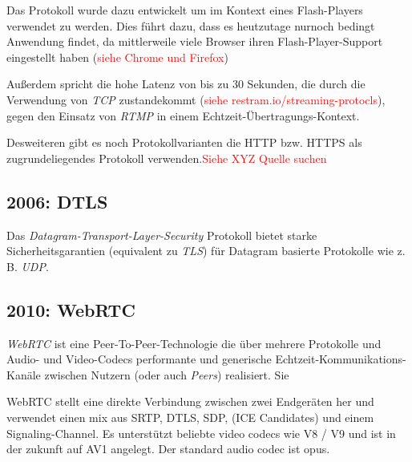 \documentclass{article}
\begin{document}
\begin{onecolumn}
Das Protokoll wurde dazu entwickelt um im Kontext eines Flash-Players verwendet
zu werden. Dies führt dazu, dass es heutzutage nurnoch bedingt Anwendung
findet, da mittlerweile viele Browser ihren Flash-Player-Support eingestellt
haben (\textcolor{red}{siehe Chrome und Firefox}) %

Außerdem spricht die hohe Latenz von bis zu 30 Sekunden, die durch die
Verwendung von \textit{TCP} zustandekommt (\textcolor{red}{siehe
restram.io/streaming-protocls}), gegen den Einsatz von \textit{RTMP} in einem
Echtzeit-Übertragungs-Kontext.

Desweiteren gibt es noch Protokollvarianten die HTTP bzw. HTTPS als zugrundeliegendes
Protokoll verwenden.\textcolor{red}{Siehe XYZ Quelle suchen}

\subsection{2006: DTLS}

Das \textit{Datagram-Transport-Layer-Security} Protokoll bietet starke
Sicherheitsgarantien (equivalent zu \textit{TLS}) für Datagram basierte
Protokolle wie z. B. \textit{UDP}.~\cite{RFC4347}

\subsection{2010: WebRTC}

\textit{WebRTC} ist eine Peer-To-Peer-Technologie die über mehrere Protokolle
und Audio- und Video-Codecs performante und generische
Echtzeit-Kommunikations-Kanäle zwischen Nutzern (oder auch \textit{Peers})
realisiert. Sie 

WebRTC stellt eine direkte Verbindung zwischen zwei Endgeräten her und
verwendet einen mix aus SRTP, DTLS, SDP, (ICE Candidates) und einem
Signaling-Channel. Es unterstützt beliebte video codecs wie V8 / V9 und ist in
der zukunft auf AV1 angelegt. Der standard audio codec ist opus.






\end{onecolumn}
\end{document}
